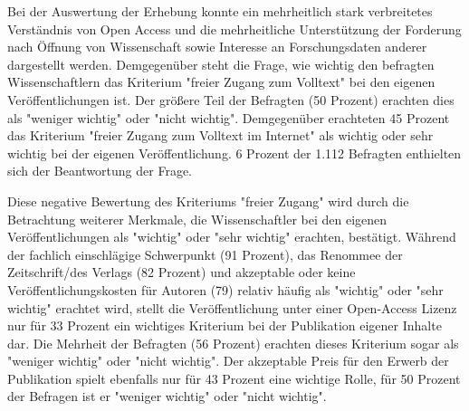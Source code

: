  Bei der Auswertung der Erhebung konnte ein mehrheitlich stark verbreitetes Verständnis von Open Access und die mehrheitliche Unterstützung der Forderung nach Öffnung von Wissenschaft sowie Interesse an Forschungsdaten anderer dargestellt werden. Demgegenüber steht die Frage, wie wichtig den befragten Wissenschaftlern das Kriterium "freier Zugang zum Volltext" bei den eigenen Veröffentlichungen ist. Der größere Teil der Befragten (50 Prozent) erachten dies als "weniger wichtig" oder "nicht wichtig". Demgegenüber erachteten 45 Prozent das Kriterium "freier Zugang zum Volltext im Internet" als wichtig oder sehr wichtig bei der eigenen Veröffentlichung. 6 Prozent der 1.112 Befragten enthielten sich der Beantwortung der Frage.

Diese negative Bewertung des Kriteriums "freier Zugang" wird durch die Betrachtung weiterer Merkmale, die Wissenschaftler bei den eigenen Veröffentlichungen als "wichtig" oder "sehr wichtig" erachten, bestätigt. Während der fachlich einschlägige Schwerpunkt (91 Prozent), das Renommee der Zeitschrift/des Verlags (82 Prozent) und akzeptable oder keine Veröffentlichungskosten für Autoren (79) relativ häufig als "wichtig" oder "sehr wichtig" erachtet wird, stellt die Veröffentlichung unter einer Open-Access Lizenz nur für 33 Prozent ein wichtiges Kriterium bei der Publikation eigener Inhalte dar. Die Mehrheit der Befragten (56 Prozent) erachten dieses Kriterium sogar als "weniger wichtig" oder "nicht wichtig". Der akzeptable Preis für den Erwerb der Publikation spielt ebenfalls nur für 43 Prozent eine wichtige Rolle, für 50 Prozent der Befragen ist er "weniger wichtig" oder "nicht wichtig".

